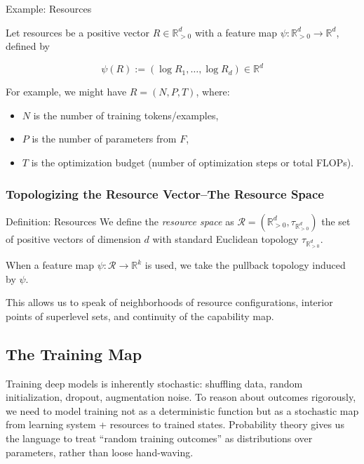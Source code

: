 \documentclass[12pt]{article}
\newcommand{\R}{\mathbb{R}}
\begin{document}
\begin{statementbox}{Example: Resources}

Let resources be a positive vector $R\in \mathbb R^d_{>0}$ with a feature map $\psi:\mathbb R^d_{>0}\to \mathbb R^d$, defined by

\[
\psi(R):=(\log R_1,\dots,\log R_d)\in \mathbb R^d
\]

For example, we might have $R=(N,P,T)$, where:
\begin{itemize}
    \item $N$ is the number of training tokens/examples,
    \item $P$ is the number of parameters from $F$,
    \item $T$ is the optimization budget (number of optimization steps or total FLOPs).
\end{itemize}

\end{statementbox}

\subsubsection{Topologizing the Resource Vector--The Resource Space}

\begin{statementbox}{Definition: Resources}
    We define the \textit{resource space} as $\mathcal R=(\R^d_{>0}, \tau_{\R^d_{>0}})$ the set of positive vectors of dimension $d$ with standard Euclidean topology $\tau_{\R^d_{>0}}$.

    When a feature map $\psi:\mathcal R \to \R^k$ is used, we take the pullback topology induced by $\psi$.
\end{statementbox}

This allows us to speak of neighborhoods of resource configurations, interior points of superlevel sets, and continuity of the capability map. 

\subsection{The Training Map}

Training deep models is inherently stochastic: shuffling data, random initialization, dropout, augmentation noise. To reason about outcomes rigorously, we need to model training not as a deterministic function but as a stochastic map from learning system + resources to trained states. Probability theory gives us the language to treat “random training outcomes” as distributions over parameters, rather than loose hand-waving.
\end{document}
